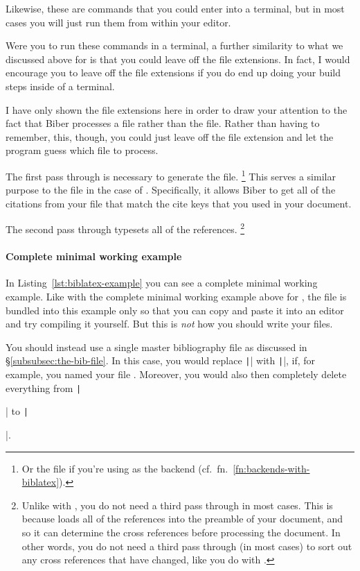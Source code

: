 Likewise, these are commands that you could enter into a terminal, but in most cases you will just run them from within your editor.

Were you to run these commands in a terminal, a further similarity to what we discussed above for  is that you could leave off the file extensions.
In fact, I would encourage you to leave off the file extensions if you do end up doing your build steps inside of a terminal.

I have only shown the file extensions here in order to draw your attention to the fact that Biber processes a  file rather than the  file.
Rather than having to remember, this, though, you could just leave off the file extension and let the program guess which file to process.

The first pass through  is necessary to generate the  file.%
\footnote{%
Or the  file if you're using  as the backend (cf.~fn.~\ref{fn:backends-with-biblatex}).
}
This serves a similar purpose to the  file in the case of .
Specifically, it allows Biber to get all of the citations from your  file that match the cite keys that you used in your  document.

The second pass through  typesets all of the references.%
\footnote{%
Unlike with , you do not need a third pass through  in most cases.
This is because  loads all of the references into the preamble of your document, and so it can determine the cross references before processing the document.
In other words, you do not need a third pass through  (in most cases) to sort out any cross references that have changed, like you do with .%
}

\paragraph{Complete minimal working example}

In Listing~\ref{lst:biblatex-example} you can see a complete minimal working example.
Like with the complete minimal working example above for , the  file is bundled into this example only so that you can copy and paste it into an editor and try compiling it yourself.
But this is \emph{not} how you should write your  files.

You should instead use a single master bibliography file as discussed in \S\ref{subsubsec:the-bib-file}.
In this case, you would replace \texttt|| with \texttt||, if, for example, you named your  file .
Moreover, you would also then completely delete everything from \texttt|\begin{filecontents}| to \texttt|\end{filecontents}|.

